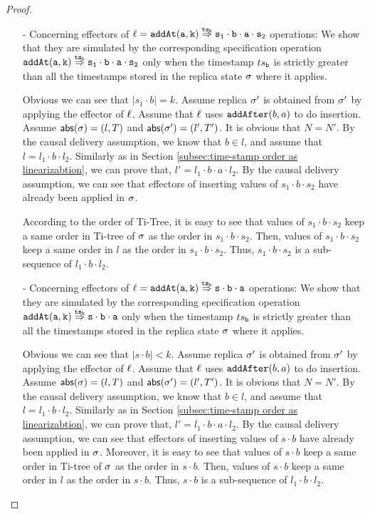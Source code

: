 \begin {proof}
\begin{itemize}
\item[-] Concerning effectors of $\alabel = \alabellongind[{\tt addAt}]{a,k}{s_1 \cdot b \cdot a \cdot s_2}{\ats_b}{}$ operations: We show that they are simulated by the corresponding specification operation $\alabellongind[{\tt addAt}]{a,k}{s_1 \cdot b \cdot a \cdot s_2}{\ats_b}{}$ only when the timestamp $\ats_{\tt b}$ is strictly greater than all the timestamps stored in the replica state $\astate$ where it applies. 
    
    Obvious we can see that $\vert s_1 \cdot b \vert = k$. Assume replica $\astate'$ is obtained from $\astate'$ by applying the effector of $\alabel$. Assume that $\alabel$ uses $\alabelshort[\mathtt{addAfter}]{b,a}$ to do insertion. Assume $\refmap(\astate) = (l,T)$ and $\refmap(\astate') = (l',T')$. It is obvious that $N = N'$. By the causal delivery assumption, we know that $b \in l$, and assume that $l = l_1 \cdot b \cdot l_2$. Similarly as in Section \ref{subsec:time-stamp order as linearizabtion}, we can prove that, $l' = l_1 \cdot b \cdot a \cdot l_2$. By the causal delivery assumption, we can see that effectors of inserting values of $s_1 \cdot b \cdot s_2$ have already been applied in $\astate$. 
    
    According to the order of Ti-Tree, it is easy to see that values of $s_1 \cdot b \cdot s_2$ keep a same order in Ti-tree of $\astate$ as the order in $s_1 \cdot b \cdot s_2$. Then, values of $s_1 \cdot b \cdot s_2$ keep a same order in $l$ as the order in $s_1 \cdot b \cdot s_2$. Thus, $s_1 \cdot b \cdot s_2$ is a sub-sequence of $l_1 \cdot b \cdot l_2$.

\item[-] Concerning effectors of $\alabel = \alabellongind[{\tt addAt}]{a,k}{s \cdot b \cdot a}{\ats_b}{}$ operations: We show that they are simulated by the corresponding specification operation $\alabellongind[{\tt addAt}]{a,k}{s \cdot b \cdot a}{\ats_b}{}$ only when the timestamp $\ats_{\tt b}$ is strictly greater than all the timestamps stored in the replica state $\astate$ where it applies.

    Obvious we can see that $\vert s \cdot b \vert < k$. Assume replica $\astate'$ is obtained from $\astate'$ by applying the effector of $\alabel$. Assume that $\alabel$ uses $\alabelshort[\mathtt{addAfter}]{b,a}$ to do insertion. Assume $\refmap(\astate) = (l,T)$ and $\refmap(\astate') = (l',T')$. It is obvious that $N = N'$. By the causal delivery assumption, we know that $b \in l$, and assume that $l = l_1 \cdot b \cdot l_2$. Similarly as in Section \ref{subsec:time-stamp order as linearizabtion}, we can prove that, $l' = l_1 \cdot b \cdot a \cdot l_2$. By the causal delivery assumption, we can see that effectors of inserting values of $s \cdot b$ have already been applied in $\astate$. Moreover, it is easy to see that values of $s \cdot b$ keep a same order in Ti-tree of $\astate$ as the order in $s \cdot b$. Then, values of $s \cdot b$ keep a same order in $l$ as the order in $s \cdot b$. Thus, $s \cdot b$ is a sub-sequence of $l_1 \cdot b \cdot l_2$. 


\end{itemize}
\end{proof}
